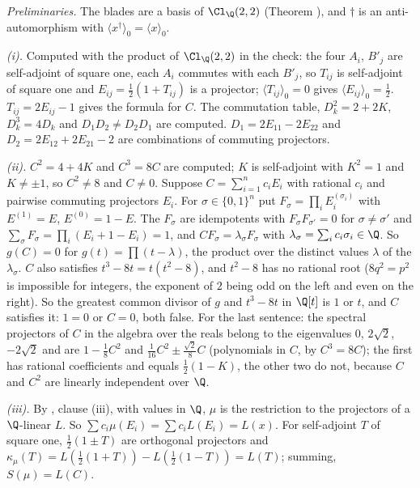 \emph{Preliminaries.} The blades are a basis of $\Cl_{\Q}(2,2)$ (Theorem ), and $\dagger$ is an anti-automorphism with $\langle x^{\dagger}\rangle_{0} = \langle x\rangle_{0}$.

\emph{(i).} Computed with the product of $\Cl_{\Q}(2,2)$ in the check: the four $A_{i}$, $B'_{j}$ are self-adjoint of square one, each $A_{i}$ commutes with each $B'_{j}$, so $T_{ij}$ is self-adjoint of square one and $E_{ij} = \tfrac12(1 + T_{ij})$ is a projector; $\langle T_{ij}\rangle_{0} = 0$ gives $\langle E_{ij}\rangle_{0} = \tfrac12$. $T_{ij} = 2E_{ij} - 1$ gives the formula for $C$. The commutation table, $D_{k}^{2} = 2 + 2K$, $D_{k}^{3} = 4D_{k}$ and $D_{1}D_{2} \ne D_{2}D_{1}$ are computed. $D_{1} = 2E_{11} - 2E_{22}$ and $D_{2} = 2E_{12} + 2E_{21} - 2$ are combinations of commuting projectors.

\emph{(ii).} $C^{2} = 4 + 4K$ and $C^{3} = 8C$ are computed; $K$ is self-adjoint with $K^{2} = 1$ and $K \ne \pm 1$, so $C^{2} \ne 8$ and $C \ne 0$. Suppose $C = \sum_{i=1}^{n}c_{i}E_{i}$ with rational $c_{i}$ and pairwise commuting projectors $E_{i}$. For $\sigma \in \{0,1\}^{n}$ put $F_{\sigma} = \prod_{i}E_{i}^{(\sigma_{i})}$ with $E^{(1)} = E$, $E^{(0)} = 1 - E$. The $F_{\sigma}$ are idempotents with $F_{\sigma}F_{\sigma'} = 0$ for $\sigma \ne \sigma'$ and $\sum_{\sigma}F_{\sigma} = \prod_{i}(E_{i} + 1 - E_{i}) = 1$, and $CF_{\sigma} = \lambda_{\sigma}F_{\sigma}$ with $\lambda_{\sigma} = \sum_{i}c_{i}\sigma_{i} \in \Q$. So $g(C) = 0$ for $g(t) = \prod(t - \lambda)$, the product over the distinct values $\lambda$ of the $\lambda_{\sigma}$. $C$ also satisfies $t^{3} - 8t = t(t^{2} - 8)$, and $t^{2} - 8$ has no rational root ($8q^{2} = p^{2}$ is impossible for integers, the exponent of $2$ being odd on the left and even on the right). So the greatest common divisor of $g$ and $t^{3} - 8t$ in $\Q[t]$ is $1$ or $t$, and $C$ satisfies it: $1 = 0$ or $C = 0$, both false. For the last sentence: the spectral projectors of $C$ in the algebra over the reals belong to the eigenvalues $0$, $2\sqrt{2}$, $-2\sqrt{2}$ and are $1 - \tfrac18C^{2}$ and $\tfrac1{16}C^{2} \pm \tfrac{\sqrt{2}}{8}C$ (polynomials in $C$, by $C^{3} = 8C$); the first has rational coefficients and equals $\tfrac12(1 - K)$, the other two do not, because $C$ and $C^{2}$ are linearly independent over $\Q$.

\emph{(iii).} By , clause (iii), with values in $\Q$, $\mu$ is the restriction to the projectors of a $\Q$-linear $L$. So $\sum c_{i}\mu(E_{i}) = \sum c_{i}L(E_{i}) = L(x)$. For self-adjoint $T$ of square one, $\tfrac12(1 \pm T)$ are orthogonal projectors and $\kappa_{\mu}(T) = L(\tfrac12(1 + T)) - L(\tfrac12(1 - T)) = L(T)$; summing, $S(\mu) = L(C)$.

